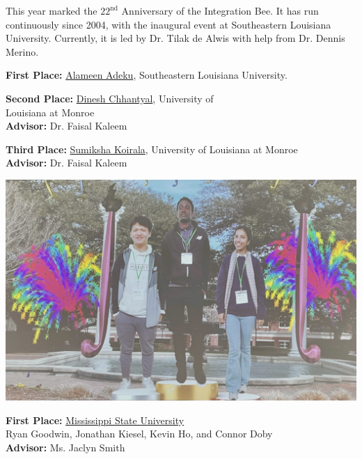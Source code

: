 \documentclass[10pt]{article} %
\begin{document}
\begin{minipage}[t]{.95\linewidth}
  \begin{multicols}{2}
    \begin{minipage}{\linewidth}
      \hypertarget{integrationbee}{} %
      This year marked the \(22^{\text{nd}}\) Anniversary of the Integration Bee.
      It has run continuously since 2004, with the inaugural event at Southeastern Louisiana University.
      Currently, it is led by Dr. Tilak de Alwis with help from Dr. Dennis Merino.

      \noindent\textbf{First Place:} \underline{Alameen Adeku}, Southeastern Louisiana University.

      \noindent\textbf{Second Place:} \underline{Dinesh Chhantyal}, University of\\ Louisiana at Monroe\\
      \textbf{Advisor:} Dr. Faisal Kaleem

      \noindent\textbf{Third Place:} \underline{Sumiksha Koirala}, University of Louisiana at Monroe\\
      \textbf{Advisor:} Dr. Faisal Kaleem
      
      \includegraphics[width=\linewidth]{integration_bee.png}\\
      
      \BackToContents %
    \end{minipage}
    
    \begin{minipage}{\linewidth}
      \hypertarget{teamcompetition}{} %
      \noindent\textbf{First Place:}
      \underline{Mississippi State University}\\
      Ryan Goodwin, Jonathan Kiesel, Kevin Ho, and Connor Doby\\
      \textbf{Advisor:} Ms. Jaclyn Smith


\end{minipage}
\end{multicols}
\end{minipage}
\end{document}

